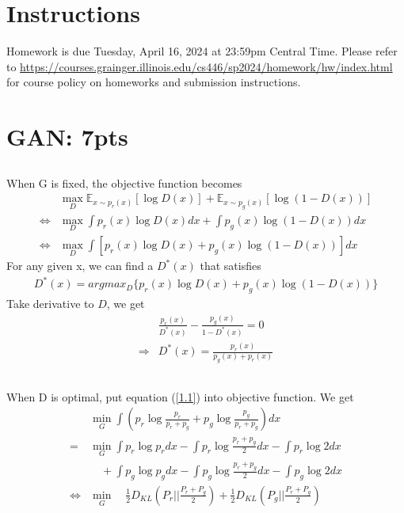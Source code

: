 \documentclass[12pt]{article}
\begin{document}
\singlespacing

\renewcommand{\familydefault}{\rmdefault}


\section{Instructions}

Homework is due Tuesday, April 16, 2024 at 23:59pm Central Time.
Please refer to \url{https://courses.grainger.illinois.edu/cs446/sp2024/homework/hw/index.html} for course policy on homeworks and submission instructions.

\section{GAN: 7pts}
\subsection{}
When G is fixed, the objective function becomes
\begin{align}
&\max_{D}\mathbb{E} _{x\sim p_r(x)}[\log D(x)]+\mathbb{E}_{x\sim p_g(x)}[\log (1-D(x))] \nonumber\\
\Leftrightarrow & \max_{D} \int p_r(x)\log D(x)dx + \int p_g(x)\log (1-D(x))dx \nonumber \\
\Leftrightarrow & \max_{D} \int [p_r(x)\log D(x) + p_g(x)\log (1-D(x))]dx \nonumber
\end{align}
For any given x, we can find a $D^*(x)$ that satisfies
\begin{align}
    D^*(x) = argmax_{D}\{ p_r(x) \log D(x) + p_g(x) \log(1-D(x)) \} \nonumber 
\end{align}
Take derivative to $D$, we get
\begin{align}
    &\frac{p_r(x)}{D^*(x)} - \frac{p_g(x)}{1-D^*(x)} = 0 \nonumber \\
    \Longrightarrow & D^*(x) = \frac{p_r(x)}{p_g(x) + p_r(x)} \label{1.1}
\end{align}

\subsection{}
When D is optimal, put equation (\ref{1.1}) into objective function. We get
\begin{align}
    & \min_{G} \int (p_r \log \frac{p_r}{p_r + p_g} + p_g \log \frac{p_g}{p_r + p_g}) dx \nonumber \\
    =& \min_{G} \int p_r \log p_r dx - \int p_r \log \frac{p_r + p_g}{2}dx - \int p_r \log 2 dx \nonumber \\
     & \quad + \int p_g \log p_g dx - \int p_g \log \frac{p_r + p_g}{2}dx - \int p_g \log 2 dx \nonumber \\
     \Leftrightarrow &  \min_{G} \quad \frac{1}{2} D_{KL}(P_r || \frac{P_r + P_g}{2}) + \frac{1}{2} D_{KL} (P_g || \frac{P_r + P_g}{2}) \nonumber
\end{align}
\end{document}
